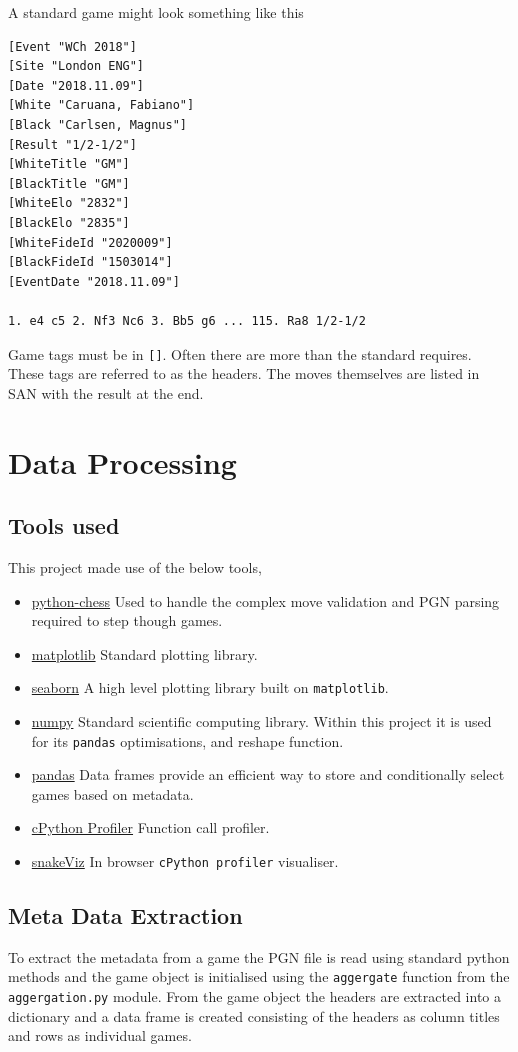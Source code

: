 \documentclass[11pt]{article}
\begin{document}
A standard game might look something like this
\begin{verbatim}
[Event "WCh 2018"]
[Site "London ENG"]
[Date "2018.11.09"]
[White "Caruana, Fabiano"]
[Black "Carlsen, Magnus"]
[Result "1/2-1/2"]
[WhiteTitle "GM"]
[BlackTitle "GM"]
[WhiteElo "2832"]
[BlackElo "2835"]
[WhiteFideId "2020009"]
[BlackFideId "1503014"]
[EventDate "2018.11.09"]

1. e4 c5 2. Nf3 Nc6 3. Bb5 g6 ... 115. Ra8 1/2-1/2
\end{verbatim}
Game tags must be in \texttt{[]}. Often there are more than the standard requires. These tags are referred to as the headers. The moves themselves are listed in SAN with the result at the end.
\section{Data Processing}
\label{sec:orgdf761ad}
\subsection{Tools used}
\label{sec:org242fd4d}
This project made use of the below tools,
\begin{itemize}
\item \href{https://github.com/niklasf/python-chess}{python-chess}
Used to handle the complex move validation and PGN parsing required to step though games.
\item \href{https://matplotlib.org/}{matplotlib}
Standard plotting library.
\item \href{https://seaborn.pydata.org/}{seaborn}
A high level plotting library built on \texttt{matplotlib}.
\item \href{https://numpy.org/}{numpy}
Standard scientific computing library. Within this project it is used for its \texttt{pandas} optimisations, and reshape function.
\item \href{https://pandas.pydata.org/}{pandas}
Data frames provide an efficient way to store and conditionally select games based on metadata.
\item \href{https://github.com/python/cpython}{cPython Profiler}
Function call profiler.
\item \href{https://jiffyclub.github.io/snakeviz/}{snakeViz}
In browser \texttt{cPython profiler} visualiser.
\end{itemize}

\subsection{Meta Data Extraction}
\label{sec:orgbd91cf5}
To extract the metadata from a game the PGN file is read using standard python methods and the game object is initialised using the \texttt{aggergate} function from the \texttt{aggergation.py} module. From the game object the headers are extracted into a dictionary and a data frame is created consisting of the headers as column titles and rows as individual games.
\end{document}
